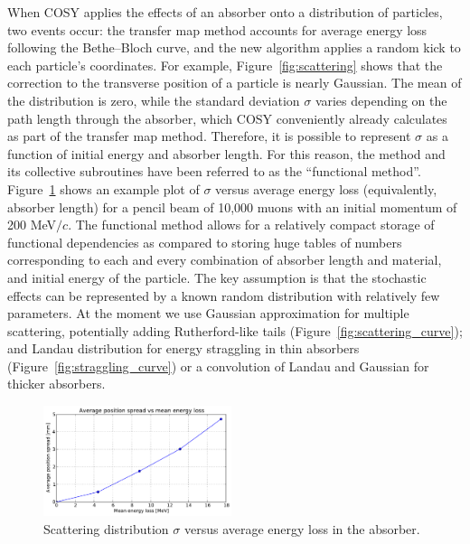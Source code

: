 \documentclass{jacow}
\begin{document}
When COSY applies the effects of an absorber onto a distribution of particles, two events occur: the transfer map method accounts for average energy loss following the Bethe--Bloch curve, and the new algorithm applies a random kick to each particle's coordinates. For example, Figure~\ref{fig:scattering} shows that the correction to the transverse position of a particle is nearly Gaussian. The mean of the distribution is zero, while the standard deviation $\sigma$ varies depending on the path length through the absorber, which COSY conveniently already calculates as part of the transfer map method. Therefore, it is possible to represent $\sigma$ as a function of initial energy and absorber length. For this reason, the method and its collective subroutines have been referred to as the ``functional method''. Figure~\ref{fig:functional} shows an example plot of $\sigma$ versus average energy loss (equivalently, absorber length) for a pencil beam of 10,000 muons with an initial momentum of 200 MeV$/c$. The functional method allows for a relatively compact storage of functional dependencies as compared to storing huge tables of numbers corresponding to each and every combination of absorber length and material, and initial energy of the particle. The key assumption is that the stochastic effects can be represented by a known random distribution with relatively few parameters. At the moment we use Gaussian approximation for multiple scattering, potentially adding Rutherford-like tails (Figure~\ref{fig:scattering_curve}); and Landau distribution for energy straggling in thin absorbers (Figure~\ref{fig:straggling_curve}) or a convolution of Landau and Gaussian for thicker absorbers.

\begin{figure}[htf]
\centering
\includegraphics[width=0.49\textwidth]{figures/functional.pdf}
\caption{Scattering distribution $\sigma$ versus average energy loss in the absorber.}
\label{fig:functional}
\end{figure}
\end{document}
